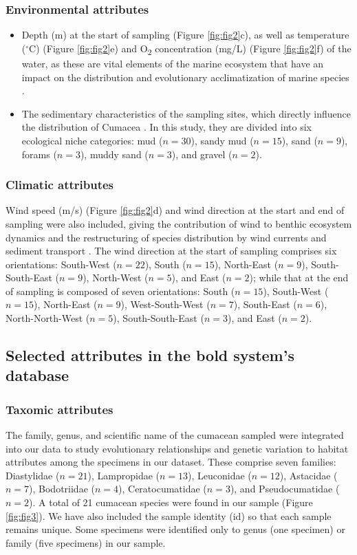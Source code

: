 \subsubsection{Environmental attributes} 
\begin{itemize}
\item Depth (m) at the start of sampling (Figure \ref{fig:fig2}c), as well as temperature ($^\circ$C) (Figure \ref{fig:fig2}e) and O\textsubscript{2} concentration (mg/L) (Figure \ref{fig:fig2}f) of the water, as these are vital elements of the marine ecosystem that have an impact on the distribution and evolutionary acclimatization of marine species \citep{rex2006global, danovaro2010first}. 
\item The sedimentary characteristics of the sampling sites, which directly influence the distribution of Cumacea \citep{uhlir_adding_2021}. In this study, they are divided into six ecological niche categories: mud ($n=30$), sandy mud ($n=15$), sand ($n=9$), forams ($n=3$), muddy sand ($n=3$), and gravel ($n=2$).
\end{itemize}

\subsubsection{Climatic attributes} 
Wind speed (m/s) (Figure \ref{fig:fig2}d) and wind direction at the start and end of sampling were also included, giving the contribution of wind to benthic ecosystem dynamics and the restructuring of species distribution by wind currents and sediment transport \citep{siedlecki2016experiments, waga_recent_2020,saeedi_environmental_2022}. The wind direction at the start of sampling comprises six orientations: South-West ($n=22$), South ($n=15$), North-East ($n=9$), South-South-East ($n=9$), North-West ($n=5$), and East ($n=2$); while that at the end of sampling is composed of seven orientations: South ($n=15$), South-West ($n=15$), North-East ($n=9$), West-South-West ($n=7$), South-East ($n=6$), North-North-West ($n=5$), South-South-East ($n=3$), and East ($n=2$). 

\subsection{Selected attributes in the bold system's database}
\subsubsection{Taxomic attributes} 
The family, genus, and scientific name of the cumacean sampled were integrated into our data to study evolutionary relationships and genetic variation to habitat attributes among the specimens in our dataset. These comprise seven families: Diastylidae ($n=21$), Lampropidae ($n=13$), Leuconidae ($n=12$), Astacidae ($n=7$), Bodotriidae ($n=4$), Ceratocumatidae ($n=3$), and Pseudocumatidae ($n=2$). A total of 21 cumacean species were found in our sample (Figure \ref{fig:fig3}). We have also included the sample identity (id) so that each sample remains unique. Some specimens were identified only to genus (one specimen) or family (five specimens) in our sample.

